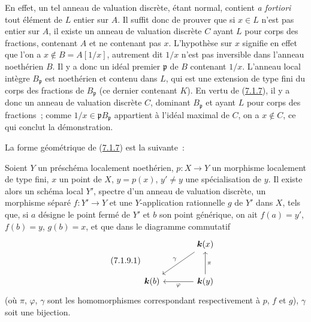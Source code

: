 En effet, un tel anneau de valuation discrète, étant normal, contient
\emph{a fortiori} tout élément de $L$ entier sur $A$. Il suffit donc de
prouver que si $x\in L$ n'est pas entier sur $A$, il existe un anneau de
valuation discrète $C$ ayant $L$ pour corps des fractions, contenant $A$ et
ne contenant pas $x$. L'hypothèse sur $x$ signifie en effet que l'on a
$x\notin B=A[1/x]$, autrement dit $1/x$ n'est pas inversible dans l'anneau
noethérien $B$. Il y a donc un idéal premier $\mathfrak{p}$ de $B$ contenant
$1/x$. L'anneau local intègre $B_{\mathfrak{p}}$ est noethérien et contenu
dans $L$, qui est une extension de type fini du corps des fractions de
$B_{\mathfrak{p}}$ (ce dernier contenant $K$). En vertu de
(\hyperref[II.7.1.7-fr]{7.1.7}), il y a donc un anneau de valuation discrète
$C$, dominant $B_{\mathfrak{p}}$ et ayant $L$ pour corps des fractions~;
comme $1/x\in\mathfrak{p}B_{\mathfrak{p}}$ appartient à l'idéal maximal de
$C$, on a $x\notin C$, ce qui conclut la démonstration.

La forme géométrique de (\hyperref[II.7.1.7-fr]{7.1.7}) est la suivante~:

\begin{proposition}[7.1.9]
\label{II.7.1.9-fr}
Soient $Y$ un préschéma localement noethérien, $p:X\to Y$ un morphisme
localement de type fini, $x$ un point de $X$, $y=p(x)$, $y'\neq y$ une
spécialisation de $y$. Il existe alors un schéma local $Y'$, spectre d'un
anneau de valuation discrète, un morphisme séparé $f:Y'\to Y$ et une
$Y$-application rationnelle $g$ de $Y'$ dans $X$, tels que, si $a$ désigne le
point fermé de $Y'$ et $b$ son point générique, on ait $f(a)=y'$,
$f(b)=y$, $g(b)=x$, et que dans le diagramme commutatif
\[
\tag{7.1.9.1}
\label{II.7.1.9.1-fr}
\begin{tikzcd}[column sep=large,row sep=large]
& \boldsymbol{k}(x) \arrow[dl,"\gamma"'] \\
\boldsymbol{k}(b) & \boldsymbol{k}(y) \arrow[u,"\pi"'] \arrow[l,"\varphi"]
\end{tikzcd}
\]
(où $\pi$, $\varphi$, $\gamma$ sont les homomorphismes correspondant
respectivement à $p$, $f$ et $g$), $\gamma$ soit une bijection.
\end{proposition}

